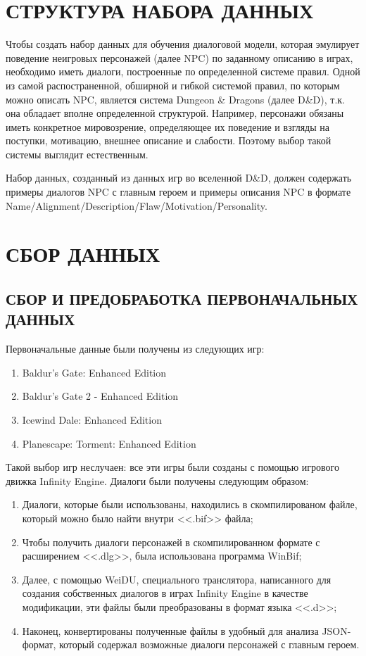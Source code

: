 \section{СТРУКТУРА НАБОРА ДАННЫХ}
Чтобы создать набор данных для обучения диалоговой модели, которая эмулирует поведение  неигровых персонажей (далее NPC) по заданному описанию в играх, необходимо иметь диалоги, построенные по определенной системе правил. Одной из самой распостраненной, обширной и гибкой системой правил, по которым можно описать NPC, является система Dungeon \& Dragons (далее D\&D), т.к. она обладает вполне определенной структурой. Например, персонажи обязаны иметь конкретное мировозрение, определяющее их поведение и взгляды на поступки, мотивацию, внешнее описание и слабости. Поэтому выбор такой системы выглядит естественным. 

Набор данных, созданный из данных игр во вселенной D\&D, должен содержать примеры диалогов NPC с главным героем и примеры описания NPC в формате Name/Alignment/Description/Flaw/Motivation/Personality.

\section{СБОР ДАННЫХ}
\subsection{СБОР И ПРЕДОБРАБОТКА ПЕРВОНАЧАЛЬНЫХ ДАННЫХ}
Первоначальные данные были получены из следующих игр: 
\begin{enumerate}
      \item Baldur's Gate: Enhanced Edition
      \item Baldur's Gate 2 - Enhanced Edition
      \item Icewind Dale: Enhanced Edition
      \item Planescape: Torment: Enhanced Edition
\end{enumerate}

Такой выбор игр неслучаен: все эти игры были созданы с помощью 
игрового движка Infinity Engine. Диалоги были получены следующим образом:
\begin{enumerate}
      \item Диалоги, которые были использованы, находились в скомпилированом файле, который можно было найти внутри <<.bif>> файла;
      \item Чтобы получить диалоги персонажей в скомпилированном формате с расширением <<.dlg>>,
            была использована программа WinBif;
      \item Далее, с помощью WeiDU, специального транслятора,
            написанного для создания собственных диалогов в играх Infinity Engine в качестве модификации, 
            эти файлы были преобразованы в формат языка <<.d>>; 
      \item Наконец, конвертированы полученные файлы в удобный для анализа JSON-формат,
            который содержал возможные диалоги персонажей с главным героем.
\end{enumerate}

